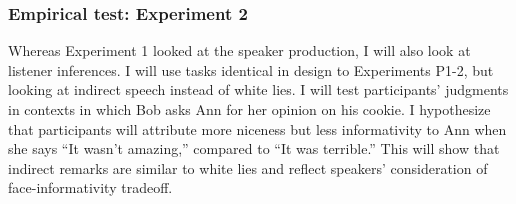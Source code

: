 \subsubsection{Empirical test: Experiment 2} Whereas Experiment 1 looked at the speaker production, I will also look at listener inferences. I will use tasks identical in design to Experiments P1-2, but looking at indirect speech instead of white lies. I will test participants' judgments in contexts in which Bob asks Ann for her opinion on his cookie. I hypothesize that participants will attribute more niceness but less informativity to Ann when she says ``It wasn't amazing,'' compared to ``It was terrible.'' This will show that indirect remarks are similar to white lies and reflect speakers' consideration of face-informativity tradeoff.






